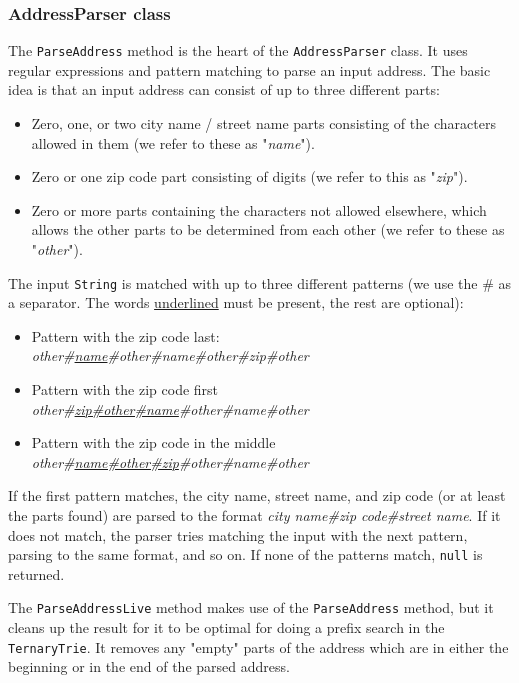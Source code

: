 \subsubsection{AddressParser class}
The \texttt{ParseAddress} method is the heart of the \texttt{AddressParser} class. It uses regular expressions and pattern matching to parse an input address. The basic idea is that an input address can consist of up to three different parts:
\begin{itemize}
	\item Zero, one, or two city name / street name parts consisting of the characters allowed in them (we refer to these as "\textit{name}").
	\item Zero or one zip code part consisting of digits (we refer to this as "\textit{zip}").
	\item Zero or more parts containing the characters not allowed elsewhere, which allows the other parts to be determined from each other (we refer to these as "\textit{other}").
\end{itemize}
The input \texttt{String} is matched with up to three different patterns (we use the \# as a separator. The words \underline{underlined} must be present, the rest are optional):
\begin{itemize}
	\item Pattern with the zip code last: \\
		\textit{other\#\underline{name}\#other\#name\#other\#zip\#other}
	\item Pattern with the zip code first \\
	\textit{other\#\underline{zip\#other\#name}\#other\#name\#other}
	\item Pattern with the zip code in the middle \\
	\textit{other\#\underline{name\#other\#zip}\#other\#name\#other}
\end{itemize}
If the first pattern matches, the city name, street name, and zip code (or at least the parts found) are parsed to the format \textit{city name\#zip code\#street name}. If it does not match, the parser tries matching the input with the next pattern, parsing to the same format, and so on. If none of the patterns match, \texttt{null} is returned.

The \texttt{ParseAddressLive} method makes use of the \texttt{ParseAddress} method, but it cleans up the result for it to be optimal for doing a prefix search in the \texttt{TernaryTrie}. It removes any "empty" parts of the address which are in either the beginning or in the end of the parsed address.

